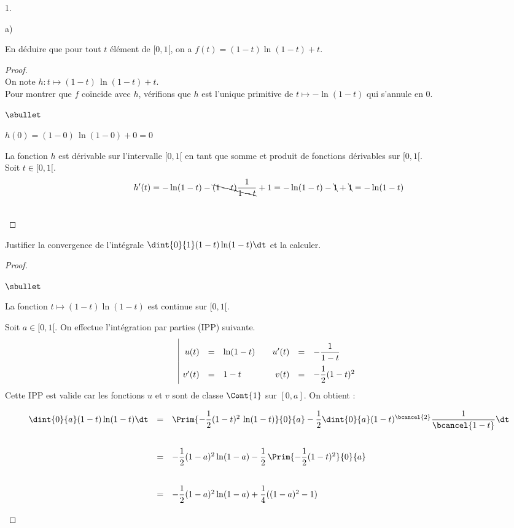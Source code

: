 \documentclass[11pt]{article}%
\begin{document}
\begin{noliste}{1.}
\begin{noliste}{a)}
  
  
  
  
  \item En déduire que pour tout $t$ élément de $[0,1[$, on a $f(t)= 
  (1-t)\ln(1-t)+t$. 
  
  \begin{proof}~\\
    On note $h:t\mapsto (1-t) \, \ln(1-t)+t$.\\
    Pour montrer que $f$ coïncide avec $h$, vérifions que $h$ est
    l'unique primitive de $t \mapsto -\ln(1-t)$ qui s'annule en $0$.
    \begin{noliste}{$\sbullet$}
      \item $h(0)=(1-0) \, \ln(1-0) +0=0$
      \item La fonction $h$ est dérivable sur l'intervalle $[0,1[$ en 
      tant que somme et produit de fonctions dérivables sur $[0,1[$.\\
      Soit $t\in [0,1[$.
      \[
        h'(t) = -\ln(1-t) -\bcancel{(1-t)} \dfrac{1}{\bcancel{1-t}}
        +1 = -\ln(1-t) -\bcancel{1} + \bcancel{1} = - \ln(1-t)
      \]
    \end{noliste}
    
    ~\\[-1.4cm]
  \end{proof}
  
  
  
  

  
  \item Justifier la convergence de l'intégrale $\dint{0}{1} 
  (1-t)\ln(1-t) \dt$ et la calculer. 
  
  \begin{proof}~
    \begin{noliste}{$\sbullet$}
      \item La fonction $t\mapsto (1-t) \ln(1-t)$ est continue 
      sur $[0,1[$.
      \item Soit $a\in [0,1[$. On effectue l'intégration par parties 
      (IPP) suivante.
      \[
	\renewcommand{\arraystretch}{2.2}
	\begin{array}{|rcl@{\qquad}rcl}
	  u(t) & = & \ln(1-t) & u'(t) & = & - \dfrac{1}{1-t} \\
	  v'(t) & = & 1-t & v(t) & = & -\dfrac{1}{2}(1-t)^2
	\end{array}
      \]
      Cette IPP est valide car les fonctions $u$ et $v$ sont de classe 
      $\Cont{1}$ sur $[0,a]$. On obtient :
      \[
        \begin{array}{rcl}
          \dint{0}{a} (1-t) \ln(1-t) \dt &=& \Prim{-\dfrac{1}{2}
          (1-t)^2 \, \ln(1-t)}{0}{a} - \dfrac{1}{2} \dint{0}{a} 
          (1-t)^{\bcancel{2}} \dfrac{1}{\bcancel{1-t}} \dt
          \\[.6cm]
          &=& - \dfrac{1}{2} (1-a)^2 \ln(1-a) - \dfrac{1}{2} 
          \, \Prim{-\dfrac{1}{2}(1-t)^2}{0}{a}
          \\[.6cm]
          &=& - \dfrac{1}{2}(1-a)^2 \ln(1-a) + \dfrac{1}{4}((1-a)^2
          -1)
        \end{array}
      \]
    

\end{noliste}
\end{proof}
\end{noliste}
\end{noliste}
\end{document}
